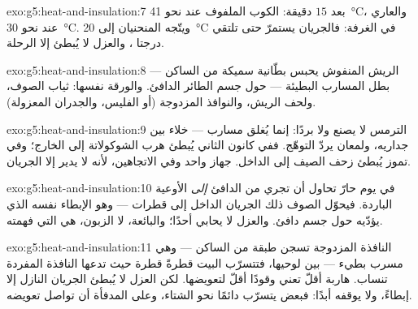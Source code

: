 \begin{solution}{exo:g5:heat-and-insulation:7}
بعد $15$ دقيقة: الكوب الملفوف عند نحو \qty{41}{\celsius}،
والعاري عند نحو \qty{30}{\celsius}. ويتّجه المنحنيان إلى
\qty{20}{\celsius} في الغرفة: فالجريان يستمرّ حتى تلتقي درجتا
، والعزل لا يُبطئ إلا الرحلة.
\end{solution}

\begin{solution}{exo:g5:heat-and-insulation:8}
الريش المنفوش يحبس بطّانية سميكة من  الساكن --- بطل
المسارب البطيئة --- حول جسم الطائر الدافئ. والورقة نفسها: ثياب
الصوف، ولحف الريش، والنوافذ المزدوجة (أو الفليس، والجدران
المعزولة).
\end{solution}

\begin{solution}{exo:g5:heat-and-insulation:9}
الترمس لا يصنع  ولا بردًا: إنما يُغلق مسارب  ---
خلاء بين جداريه، ولمعان يردّ التوهّج. ففي كانون الثاني يُبطئ هرب
 الشوكولاتة إلى الخارج؛ وفي تموز يُبطئ زحف  الصيف إلى
الداخل. جهاز واحد وفي الاتجاهين، لأنه لا يدير إلا الجريان.
\end{solution}

\begin{solution}{exo:g5:heat-and-insulation:10}
في يوم حارّ تحاول  أن تجري من  الدافئ \emph{إلى}
الأوعية الباردة. فيحوّل الصوف ذلك الجريان الداخل إلى قطرات ---
وهو الإبطاء نفسه الذي يؤدّيه حول جسم دافئ. والعزل لا يحابي
أحدًا؛ والبائعة، لا الزبون، هي التي فهمته.
\end{solution}

\begin{solution}{exo:g5:heat-and-insulation:11}
النافذة المزدوجة تسجن طبقة من  الساكن --- وهي مسرب بطيء
--- بين لوحيها، فتتسرّب  البيت قطرةً قطرة حيث تدعها
النافذة المفردة تنساب.  هاربة أقلّ تعني وقودًا أقلّ
لتعويضها. لكن العزل لا يُبطئ الجريان النازل إلا إبطاءً، ولا
يوقفه أبدًا: فبعض  يتسرّب دائمًا نحو الشتاء، وعلى المدفأة
أن تواصل تعويضه.
\end{solution}
